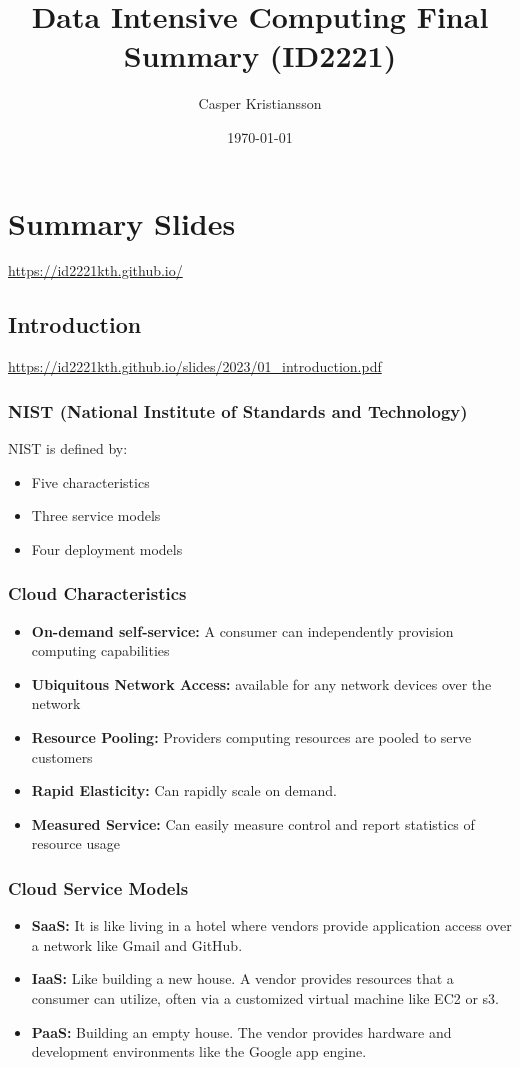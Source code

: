 \documentclass[12pt]{article}
\title{Data Intensive Computing Final Summary (ID2221)}
\author{Casper Kristiansson}
\date{\today}
\begin{document}
\maketitle

\section{Summary Slides}
\href{https://id2221kth.github.io/}{https://id2221kth.github.io/}

\subsection{Introduction}
\href{https://id2221kth.github.io/slides/2023/01\_introduction.pdf}{https://id2221kth.github.io/slides/2023/01\_introduction.pdf}

\subsubsection{NIST (National Institute of Standards and Technology)}
NIST is defined by:
\begin{itemize}
    \item Five characteristics
    \item Three service models
    \item Four deployment models
\end{itemize}

\subsubsection{Cloud Characteristics}
\begin{itemize}
    \item \textbf{On-demand self-service:} A consumer can independently provision computing capabilities
    \item \textbf{Ubiquitous Network Access:} available for any network devices over the network
    \item \textbf{Resource Pooling:} Providers computing resources are pooled to serve customers
    \item \textbf{Rapid Elasticity:} Can rapidly scale on demand.
    \item \textbf{Measured Service:} Can easily measure control and report statistics of resource usage
\end{itemize}

\subsubsection{Cloud Service Models}
\begin{itemize}
    \item \textbf{SaaS:} It is like living in a hotel where vendors provide application access over a network like Gmail and GitHub.
    \item \textbf{IaaS:} Like building a new house. A vendor provides resources that a consumer can utilize, often via a customized virtual machine like EC2 or s3.
    \item \textbf{PaaS:} Building an empty house. The vendor provides hardware and development environments like the Google app engine.
\end{itemize}
\end{document}
